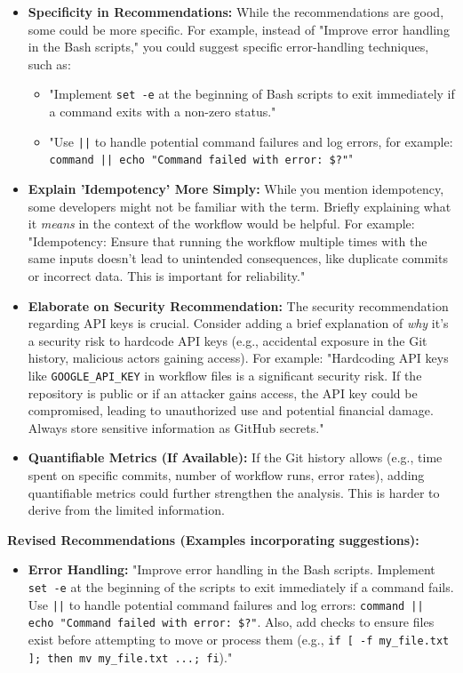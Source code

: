 \documentclass{article}
\begin{document}
\begin{itemize}
\begin{itemize}
\begin{itemize}
\begin{itemize}
    \item \textbf{Specificity in Recommendations:} While the recommendations are good, some could be more specific. For example, instead of "Improve error handling in the Bash scripts," you could suggest specific error-handling techniques, such as:
    \begin{itemize}
        \item "Implement \texttt{set -e} at the beginning of Bash scripts to exit immediately if a command exits with a non-zero status."
        \item "Use \texttt{||} to handle potential command failures and log errors, for example: \texttt{command || echo "Command failed with error: \$?"}"
    \end{itemize}
    \item \textbf{Explain 'Idempotency' More Simply:} While you mention idempotency, some developers might not be familiar with the term. Briefly explaining what it \textit{means} in the context of the workflow would be helpful. For example:  "Idempotency: Ensure that running the workflow multiple times with the same inputs doesn't lead to unintended consequences, like duplicate commits or incorrect data.  This is important for reliability."
    \item \textbf{Elaborate on Security Recommendation:}  The security recommendation regarding API keys is crucial.  Consider adding a brief explanation of \textit{why} it's a security risk to hardcode API keys (e.g., accidental exposure in the Git history, malicious actors gaining access). For example: "Hardcoding API keys like \texttt{GOOGLE\_API\_KEY} in workflow files is a significant security risk. If the repository is public or if an attacker gains access, the API key could be compromised, leading to unauthorized use and potential financial damage.  Always store sensitive information as GitHub secrets."
    \item \textbf{Quantifiable Metrics (If Available):} If the Git history allows (e.g., time spent on specific commits, number of workflow runs, error rates), adding quantifiable metrics could further strengthen the analysis.  This is harder to derive from the limited information.
\end{itemize}

\textbf{Revised Recommendations (Examples incorporating suggestions):}

\begin{itemize}
    \item \textbf{Error Handling:} "Improve error handling in the Bash scripts. Implement \texttt{set -e} at the beginning of the scripts to exit immediately if a command fails. Use \texttt{||} to handle potential command failures and log errors: \texttt{command || echo "Command failed with error: \$?"}.  Also, add checks to ensure files exist before attempting to move or process them (e.g., \texttt{if [ -f my\_file.txt ]; then mv my\_file.txt ...; fi})."


\end{itemize}
\end{itemize}
\end{itemize}
\end{itemize}
\end{document}
